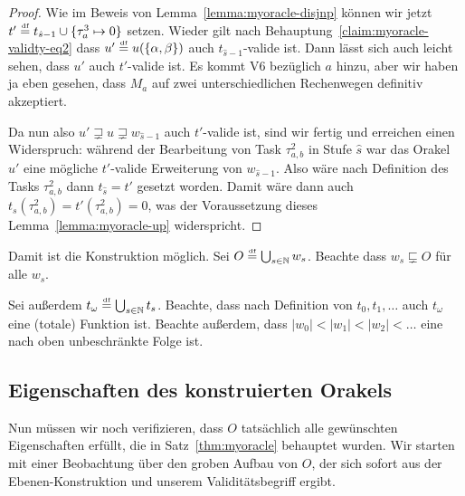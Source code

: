 \begin{proof}
Wie im Beweis von Lemma~\ref{lemma:myoracle-disjnp} können wir jetzt $t'\stackrel{\text{\smash{\tiny df}}}{=} t_{\hat{s}-1}\cup\{\tau^3_{a} \mapsto 0\}$ setzen.
Wieder gilt nach Behauptung~\ref{claim:myoracle-validty-eq2} dass $u'\stackrel{\text{\smash{\tiny df}}}{=} u(\{\alpha, \beta\})$ auch $t_{\hat{s}-1}$-valide ist.
Dann lässt sich auch leicht sehen, dass $u'$ auch $t'$-valide ist. Es kommt V6 bezüglich $a$ hinzu, aber wir haben ja eben gesehen, dass $M_a$ auf zwei unterschiedlichen Rechenwegen definitiv akzeptiert.

Da nun also $u'\sqsupsetneq u \sqsupsetneq w_{\hat{s}-1}$ auch $t'$-valide ist, sind wir fertig und erreichen einen Widerspruch: während der Bearbeitung von Task $\tau^2_{a,b}$ in Stufe $\hat{s}$ war das Orakel $u'$ eine mögliche $t'$-valide Erweiterung von $w_{\hat{s}-1}$. Also wäre nach Definition des Tasks $\tau^2_{a,b}$ dann $t_{\hat{s}}=t'$ gesetzt worden.
Damit wäre dann auch $t_{s}(\tau^2_{a,b})=t'(\tau^2_{a,b})=0$, was der Voraussetzung dieses Lemma~\ref{lemma:myoracle-up} widerspricht.
\end{proof}

Damit ist die Konstruktion möglich. Sei $O\stackrel{\text{\smash{\tiny df}}}{=} \bigcup_{s\in\mathbb N} w_s$.
Beachte dass $w_s\sqsubsetneq O$ für alle $w_s$.

Sei außerdem $t_\omega \stackrel{\text{\smash{\tiny df}}}{=} \bigcup_{s\in\mathbb N} t_s$. Beachte, dass nach Definition von $t_0, t_1, \dots$ auch $t_\omega$ eine (totale) Funktion ist.
Beachte außerdem, dass $|w_0|<|w_1|< |w_2|< \ldots$ eine nach oben unbeschränkte Folge ist.

\subsection*{Eigenschaften des konstruierten Orakels}

Nun müssen wir noch verifizieren, dass $O$ tatsächlich alle gewünschten Eigenschaften erfüllt, die in Satz~\ref{thm:myoracle} behauptet wurden.
Wir starten mit einer Beobachtung über den groben Aufbau von $O$, der sich sofort aus der Ebenen-Konstruktion und unserem Validitätsbegriff ergibt.

